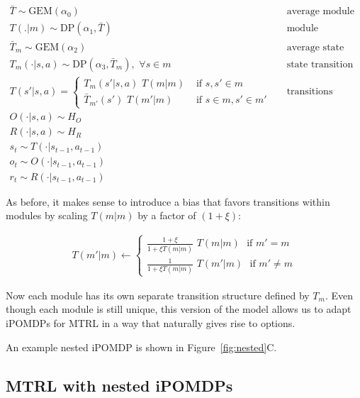 \documentclass[11pt]{article}
\begin{document}
\begin{align*}
\bar{T} \sim \text{GEM}(\alpha_0)      		&& \text{average module transition distribution}  \\
T(.|m) \sim \text{DP}(\alpha_1, \bar{T})      		&& \text{module transition distributions} \\
\bar{T}_{m} \sim \text{GEM}(\alpha_2)      		&& \text{average state transition distributions} \\
T_m(\cdot|s,a) \sim \text{DP}(\alpha_3, \bar{T}_m) ,\,\,\forall s \in m      		&& \text{state transition distributions} \\
T(s'|s,a) = \begin{cases}  T_m(s'|s,a) \,\, T(m|m) & \text{ if } s, s' \in m \\  \bar{T}_{m'}(s') \,\, T(m'|m) & \text{ if } s \in m, s' \in m'  \end{cases}			&& \text{transitions between all states} \\
O(\cdot | s,a) \sim H_O \\
R(\cdot | s,a) \sim H_R \\
s_t \sim T(\cdot | s_{t-1},a_{t-1}) \\
o_t \sim O(\cdot | s_{t-1}, a_{t-1}) \\
r_t \sim R(\cdot | s_{t-1}, a_{t-1}) 
\end{align*}

As before, it makes sense to introduce a bias that favors transitions within modules by scaling $T(m|m)$ by a factor of $(1 + \xi)$:

\begin{align*}
T(m'|m) \leftarrow \begin{cases}  \frac{1 + \xi}{1 + \xi T(m|m)} \,\, T(m|m) \,\,\text{ if }m' = m    \\  \frac{1}{1 + \xi T(m|m)} \,\, T(m'|m)\,\,\text{ if }m' \ne m  \end{cases}
\end{align*}

Now each module has its own separate transition structure defined by $T_m$. Even though each module is still unique, this version of the model allows us to adapt iPOMDPs for MTRL in a way that naturally gives rise to options.

An example nested iPOMDP is shown in Figure~\ref{fig:nested}C.

\subsection{MTRL with nested iPOMDPs}
\end{document}
